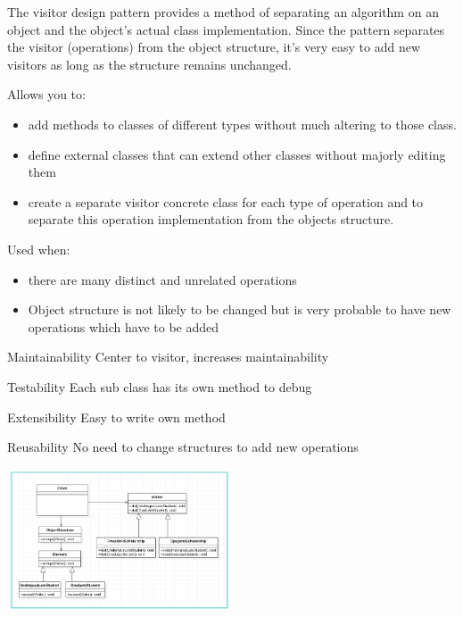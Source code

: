 
\begin{summary}
The visitor design pattern provides a method of separating an algorithm on an
object and the object’s actual class implementation.  Since the pattern
separates the visitor (operations) from the object structure, it's very easy to
add new visitors as long as the structure remains unchanged.
\end{summary}

Allows you to: \begin{itemize}
    \item add methods to classes of different types without much altering to
        those class.
    \item define external classes that can extend other classes without majorly
        editing them
    \item create a separate visitor concrete class for each type of operation
        and to separate this operation implementation from the objects
        structure.
\end{itemize}

Used when: \begin{itemize}
    \item there are many distinct and unrelated operations
    \item Object structure is not likely to be changed but is very probable to
        have new operations which have to be added
\end{itemize}



\begin{nfps}
\item[Maintainability] Center to visitor, increases maintainability
\item[Testability] Each sub class has its own method to debug
\item[Extensibility] Easy to write own method
\item[Reusability] No need to change structures to add new operations
\end{nfps}

\begin{center}
    \includegraphics[width=0.5\textwidth]{./visitor}
\end{center}
